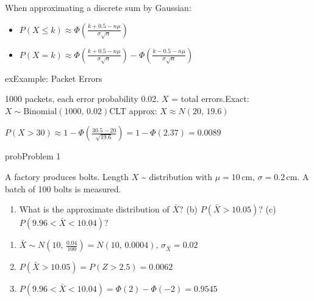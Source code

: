 
When approximating a discrete sum by Gaussian:

\begin{itemize}
\tightlist
\item
  $\displaystyle P(X \le k) \approx \Phi \left(\frac{k + 0.5 - n\mu}{\sigma \sqrt{n}}\right)$
\item
  $\displaystyle P(X = k) \approx \Phi \left(\frac{k + 0.5 - n\mu}{\sigma \sqrt{n}}\right) - \Phi \left(\frac{k - 0.5 - n\mu}{\sigma \sqrt{n}}\right)$
\end{itemize}

\begin{PSbox}[unbreakable]{ex}{Example: Packet Errors}

1000 packets, each error probability 0.02. $X$ = total errors.\PSbr{}Exact: $X \sim \mathrm{Binomial}(1000,\, 0.02)$\PSbr{}CLT approx: $X \approx N(20,\, 19.6)$

$\displaystyle P(X > 30) \approx 1 - \Phi \left(\frac{30.5 - 20}{\sqrt{19.6}}\right) = 1 - \Phi (2.37) = 0.0089$

\end{PSbox}


\begin{PSbox}[unbreakable]{prob}{Problem 1}

A factory produces bolts. Length $X$ \textasciitilde{} distribution with $\mu = 10\,\mathrm{cm},\, \sigma = 0.2\,\mathrm{cm}$. A batch of 100 bolts is measured.

\begin{enumerate}
\def\labelenumi{(\alph{enumi})}
\tightlist
\item
  What is the approximate distribution of $\bar{X}$? (b) $P(\bar{X} > 10.05)$? (c) $P(9.96 < \bar{X} < 10.04)$?
\end{enumerate}

\PSsolution{} 

\begin{enumerate}
\def\labelenumi{(\alph{enumi})}
\tightlist
\item
  $\displaystyle \bar{X} \sim N\left(10,\, \frac{0.04}{100}\right) = N(10,\, 0.0004),\, \sigma_{\bar{X}} = 0.02$
\item
  $P(\bar{X} > 10.05) = P(Z > 2.5) = 0.0062$
\item
  $P(9.96 < \bar{X} < 10.04) = \Phi (2) - \Phi (-2) = 0.9545$
\end{enumerate}

\end{PSbox}

